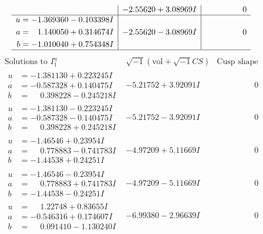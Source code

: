 \documentclass[1p]{elsarticle_modified}
\theoremstyle{definition}
\newcommand{\I}{\sqrt{-1}}
\begin{document}
$$\begin{array}{c|c|c}
 & -2.55620 + 3.08969 I & \phantom{-0.000000 } 0 \\ \hline\begin{aligned}
u &= -1.369360 - 0.103398 I \\
a &= \phantom{-}1.140050 + 0.314674 I \\
b &= -1.010040 + 0.754348 I\end{aligned}
 & -2.55620 - 3.08969 I & \phantom{-0.000000 } 0\\
 \hline 
 \end{array}$$\newpage$$\begin{array}{c|c|c}  
\text{Solutions to }I^u_{1}& \I (\text{vol} + \sqrt{-1}CS) & \text{Cusp shape}\\
 \hline 
\begin{aligned}
u &= -1.381130 + 0.223245 I \\
a &= -0.587328 + 0.140475 I \\
b &= \phantom{-}0.398228 - 0.245218 I\end{aligned}
 & -5.21752 + 3.92091 I & \phantom{-0.000000 } 0 \\ \hline\begin{aligned}
u &= -1.381130 - 0.223245 I \\
a &= -0.587328 - 0.140475 I \\
b &= \phantom{-}0.398228 + 0.245218 I\end{aligned}
 & -5.21752 - 3.92091 I & \phantom{-0.000000 } 0 \\ \hline\begin{aligned}
u &= -1.46546 + 0.23954 I \\
a &= \phantom{-}0.778883 - 0.741783 I \\
b &= -1.44538 + 0.24251 I\end{aligned}
 & -4.97209 + 5.11669 I & \phantom{-0.000000 } 0 \\ \hline\begin{aligned}
u &= -1.46546 - 0.23954 I \\
a &= \phantom{-}0.778883 + 0.741783 I \\
b &= -1.44538 - 0.24251 I\end{aligned}
 & -4.97209 - 5.11669 I & \phantom{-0.000000 } 0 \\ \hline\begin{aligned}
u &= \phantom{-}1.22748 + 0.83655 I \\
a &= -0.546316 + 0.174607 I \\
b &= \phantom{-}0.091410 - 1.130240 I\end{aligned}
 & -6.99380 - 2.96639 I & \phantom{-0.000000 } 0 \\ \hline\begin{aligned}

\end{aligned}
\end{array}$$
\end{document}

